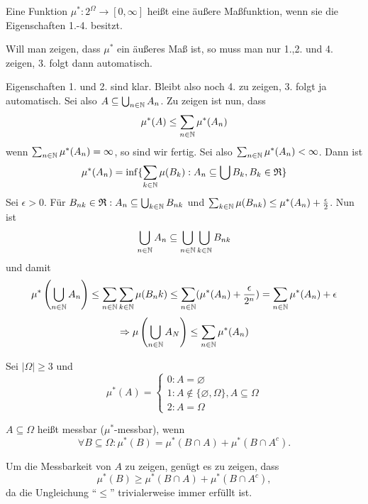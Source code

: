 			\begin{defi}
				Eine Funktion $\mu^*: 2^\Omega \to [0,\infty]$ heißt eine äußere Maßfunktion, wenn sie die Eigenschaften 1.-4. besitzt.
			\end{defi}	
			
			\begin{bem}
				Will man zeigen, dass $\mu^*$ ein äußeres Maß ist, so muss man nur 1.,2. und 4. zeigen, 3. folgt dann automatisch. 
			\end{bem}
			
			\begin{bew}
				Eigenschaften 1. und 2. sind klar. Bleibt also noch 4. zu zeigen, 3. folgt ja automatisch. \newline
				Sei also $A\subseteq \bigcup_{n\in\mathbb{N}} A_n$. Zu zeigen ist nun, dass 
				\[ \mu^* (A)\le \sum_{n\in\mathbb{N}} \mu^*(A_n) \]
				wenn $\sum_{n\in\mathbb{N}} \mu^*(A_n)=\infty$, so sind wir fertig.\newline
				Sei also $\sum_{n\in\mathbb{N}} \mu^*(A_n)<\infty$. Dann ist
				\[ \mu^*(A_n)=\inf\{\sum_{k\in\mathbb{N}}\mu(B_k): A_n\subseteq \bigcup B_k, B_k\in\mathfrak{R}\} \]
				Sei $\epsilon >0$. Für $B_{nk}\in\mathfrak{R}: A_n\subseteq\bigcup_{k\in\mathbb{N}} B_{nk}$ und $\sum_{k\in\mathbb{N}} \mu(B_{nk})\le \mu^*(A_n)+\frac{\epsilon}{2}$. Nun ist
				\[ \bigcup_{n\in\mathbb{N}} A_n\subseteq \bigcup_{n\in\mathbb{N}}\bigcup_{k\in\mathbb{N}} B_{nk} \]
				und damit
				\[ \mu^*\left(\bigcup_{n\in\mathbb{N}} A_n\right)\le \sum_{n\in\mathbb{N}}\sum_{k\in\mathbb{N}} \mu(B_nk) \le \sum_{n\in\mathbb{N}} (\mu^*(A_n)+\frac{\epsilon}{2^n})=\sum_{n\in\mathbb{N}} \mu^* (A_n)+\epsilon \]
				\[ \Rightarrow \mu\left(\bigcup_{n\in\mathbb{N}}A_N\right)\le\sum_{n\in\mathbb{N}} \mu^* (A_n) \]
				\arge
			\end{bew}
			
			\begin{bsp}
				Sei $|\Omega|\ge 3$ und 
				$$\mu^*(A)=\left\{\begin{array}{l}
					0: A=\varnothing\\
					1: A\notin\{\varnothing, \Omega\}, A\subseteq\Omega\\
					2: A=\Omega
				\end{array}\right. $$
			\end{bsp}
			
			\begin{defi}
				$A\subseteq \Omega$ heißt messbar ($\mu^*$-messbar), wenn 
				\[ \forall B\subseteq \Omega: \mu^*(B)=\mu^*(B\cap A)+\mu^*(B\cap A^c). \]
			\end{defi}
			
			\begin{bem}
				Um die Messbarkeit von $A$ zu zeigen, genügt es zu zeigen, dass
				\[ \mu^*(B)\ge \mu^*(B\cap A)+\mu^*(B\cap A^c), \]
				da die Ungleichung "`$\le$"' trivialerweise immer erfüllt ist. 
			\end{bem}
			

